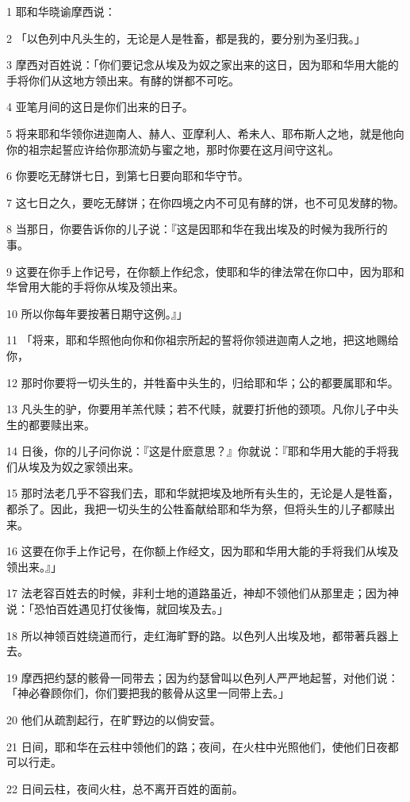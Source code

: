 \par 1 耶和华晓谕摩西说：
\par 2 「以色列中凡头生的，无论是人是牲畜，都是我的，要分别为圣归我。」
\par 3 摩西对百姓说：「你们要记念从埃及为奴之家出来的这日，因为耶和华用大能的手将你们从这地方领出来。有酵的饼都不可吃。
\par 4 亚笔月间的这日是你们出来的日子。
\par 5 将来耶和华领你进迦南人、赫人、亚摩利人、希未人、耶布斯人之地，就是他向你的祖宗起誓应许给你那流奶与蜜之地，那时你要在这月间守这礼。
\par 6 你要吃无酵饼七日，到第七日要向耶和华守节。
\par 7 这七日之久，要吃无酵饼；在你四境之内不可见有酵的饼，也不可见发酵的物。
\par 8 当那日，你要告诉你的儿子说：『这是因耶和华在我出埃及的时候为我所行的事。
\par 9 这要在你手上作记号，在你额上作纪念，使耶和华的律法常在你口中，因为耶和华曾用大能的手将你从埃及领出来。
\par 10 所以你每年要按著日期守这例。』」
\par 11 「将来，耶和华照他向你和你祖宗所起的誓将你领进迦南人之地，把这地赐给你，
\par 12 那时你要将一切头生的，并牲畜中头生的，归给耶和华；公的都要属耶和华。
\par 13 凡头生的驴，你要用羊羔代赎；若不代赎，就要打折他的颈项。凡你儿子中头生的都要赎出来。
\par 14 日後，你的儿子问你说：『这是什麽意思？』你就说：『耶和华用大能的手将我们从埃及为奴之家领出来。
\par 15 那时法老几乎不容我们去，耶和华就把埃及地所有头生的，无论是人是牲畜，都杀了。因此，我把一切头生的公牲畜献给耶和华为祭，但将头生的儿子都赎出来。
\par 16 这要在你手上作记号，在你额上作经文，因为耶和华用大能的手将我们从埃及领出来。』」
\par 17 法老容百姓去的时候，非利士地的道路虽近，神却不领他们从那里走；因为神说：「恐怕百姓遇见打仗後悔，就回埃及去。」
\par 18 所以神领百姓绕道而行，走红海旷野的路。以色列人出埃及地，都带著兵器上去。
\par 19 摩西把约瑟的骸骨一同带去；因为约瑟曾叫以色列人严严地起誓，对他们说：「神必眷顾你们，你们要把我的骸骨从这里一同带上去。」
\par 20 他们从疏割起行，在旷野边的以倘安营。
\par 21 日间，耶和华在云柱中领他们的路；夜间，在火柱中光照他们，使他们日夜都可以行走。
\par 22 日间云柱，夜间火柱，总不离开百姓的面前。

